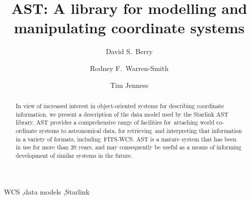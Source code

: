 \documentclass[final,authoryear,5p,times,twocolumn]{elsarticle}
\begin{document}
\begin{frontmatter}



\title{AST: A library for modelling and manipulating coordinate systems}


\author[jac,eao]{David S.\ Berry}
\author[ral]{Rodney F.\ Warren-Smith}
\author[jac,lsst]{Tim Jenness}


\address[jac]{Joint Astronomy Centre, 660 N.\ A`oh\=ok\=u Place, Hilo, HI
  96720, USA}
\address[eao]{East Asian Observatory, 660 N.\ A`oh\=ok\=u Place, Hilo, HI
  96720, USA}
\address[ral]{RAL Space, STFC Rutherford Appleton Laboratory, Harwell Oxford, Didcot, Oxfordshire OX11 0QX, UK}
\address[lsst]{LSST Project Office, 933 N.\ Cherry Ave, Tucson, AZ~85721, USA}


\begin{abstract}
In view of increased interest in object-oriented systems for describing
coordinate information, we present a description of the data model used
by the Starlink AST library. AST provides a comprehensive range of
facilities for attaching world co-ordinate systems to astronomical data,
for retrieving and interpreting that information in a variety of
formats, including FITS-WCS. AST is a mature system that has been in use
for more than 20 years, and may consequently be useful as a means of
informing development of similar systems in the future.
\end{abstract}

\begin{keyword}


WCS \sep data models \sep Starlink

\end{keyword}

\end{frontmatter}
\end{document}
